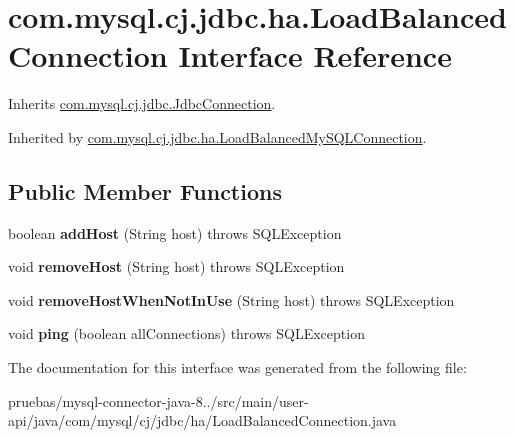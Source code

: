 \hypertarget{interfacecom_1_1mysql_1_1cj_1_1jdbc_1_1ha_1_1_load_balanced_connection}{}\section{com.\+mysql.\+cj.\+jdbc.\+ha.\+Load\+Balanced\+Connection Interface Reference}
\label{interfacecom_1_1mysql_1_1cj_1_1jdbc_1_1ha_1_1_load_balanced_connection}


Inherits \mbox{\hyperlink{interfacecom_1_1mysql_1_1cj_1_1jdbc_1_1_jdbc_connection}{com.\+mysql.\+cj.\+jdbc.\+Jdbc\+Connection}}.



Inherited by \mbox{\hyperlink{classcom_1_1mysql_1_1cj_1_1jdbc_1_1ha_1_1_load_balanced_my_s_q_l_connection}{com.\+mysql.\+cj.\+jdbc.\+ha.\+Load\+Balanced\+My\+S\+Q\+L\+Connection}}.

\subsection*{Public Member Functions}
\begin{DoxyCompactItemize}
\item 
\mbox{\label{interfacecom_1_1mysql_1_1cj_1_1jdbc_1_1ha_1_1_load_balanced_connection_a25dd02bb1c6b28d3c639e447439e2f79}} 
boolean {\bfseries add\+Host} (String host)  throws S\+Q\+L\+Exception
\item 
\mbox{\label{interfacecom_1_1mysql_1_1cj_1_1jdbc_1_1ha_1_1_load_balanced_connection_a41b452c0ebbd9f7dd3f8a8d6958df670}} 
void {\bfseries remove\+Host} (String host)  throws S\+Q\+L\+Exception
\item 
\mbox{\label{interfacecom_1_1mysql_1_1cj_1_1jdbc_1_1ha_1_1_load_balanced_connection_a752d8892b856e9acc215aeaa9fe293ef}} 
void {\bfseries remove\+Host\+When\+Not\+In\+Use} (String host)  throws S\+Q\+L\+Exception
\item 
\mbox{\label{interfacecom_1_1mysql_1_1cj_1_1jdbc_1_1ha_1_1_load_balanced_connection_a25239c6d5650eed007db3f8a12ba3e6f}} 
void {\bfseries ping} (boolean all\+Connections)  throws S\+Q\+L\+Exception
\end{DoxyCompactItemize}


The documentation for this interface was generated from the following file\+:\begin{DoxyCompactItemize}
\item 
pruebas/mysql-\/connector-\/java-\/8../src/main/user-\/api/java/com/mysql/cj/jdbc/ha/Load\+Balanced\+Connection.\+java\end{DoxyCompactItemize}
